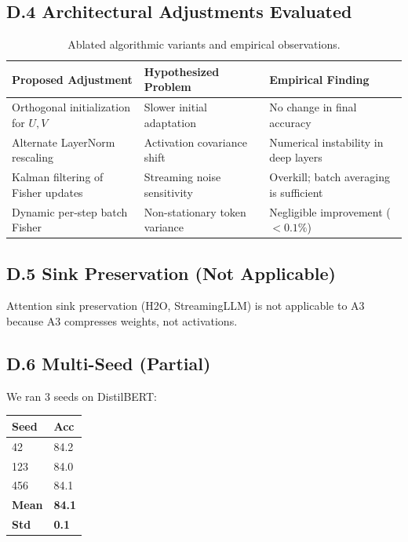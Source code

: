 \subsection{D.4 Architectural Adjustments Evaluated}

\begin{table}[H]
\centering
\small
\begin{tabular}{lll}
\toprule
\textbf{Proposed Adjustment} & \textbf{Hypothesized Problem} & \textbf{Empirical Finding} \\
\midrule
Orthogonal initialization for $U, V$ & Slower initial adaptation & No change in final accuracy \\
Alternate LayerNorm rescaling & Activation covariance shift & Numerical instability in deep layers \\
Kalman filtering of Fisher updates & Streaming noise sensitivity & Overkill; batch averaging is sufficient \\
Dynamic per-step batch Fisher & Non-stationary token variance & Negligible improvement ($<0.1\%$) \\
\bottomrule
\end{tabular}
\caption{Ablated algorithmic variants and empirical observations.}
\label{tab:negative_variants}
\end{table}

\subsection{D.5 Sink Preservation (Not Applicable)}

Attention sink preservation (H2O, StreamingLLM) is not applicable to A3 
because A3 compresses weights, not activations.

\subsection{D.6 Multi-Seed (Partial)}

We ran 3 seeds on DistilBERT:

\begin{table}[H]
\centering
\small
\begin{tabular}{ll}
\toprule
\textbf{Seed} & \textbf{Acc} \\
\midrule
42 & 84.2 \\
123 & 84.0 \\
456 & 84.1 \\
\textbf{Mean} & \textbf{84.1} \\
\textbf{Std} & \textbf{0.1} \\
\bottomrule
\end{tabular}
\end{table}

